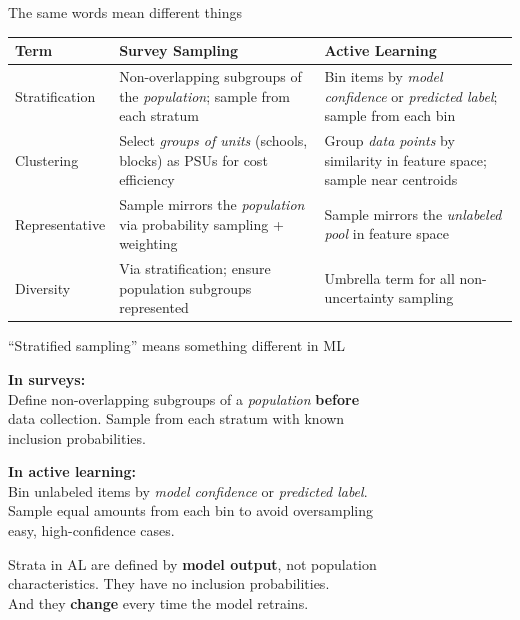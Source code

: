 \documentclass[aspectratio=169,11pt]{beamer}
\begin{document}
\begin{frame}{The same words mean different things}
\begin{center}
\footnotesize
\begin{tabularx}{\textwidth}{lXX}
\toprule
\textbf{Term} & \textbf{Survey Sampling} & \textbf{Active Learning} \\
\midrule
Stratification & Non-overlapping subgroups of the \textit{population}; sample from each stratum &
  Bin items by \textit{model confidence} or \textit{predicted label}; sample from each bin \\[0.8em]
Clustering & Select \textit{groups of units} (schools, blocks) as PSUs for cost efficiency &
  Group \textit{data points} by similarity in feature space; sample near centroids \\[0.8em]
Representative & Sample mirrors the \textit{population} via probability sampling + weighting &
  Sample mirrors the \textit{unlabeled pool} in feature space \\[0.8em]
Diversity & Via stratification; ensure population subgroups represented &
  Umbrella term for all non-uncertainty sampling \\
\bottomrule
\end{tabularx}
\end{center}
\end{frame}

\begin{frame}{``Stratified sampling'' means something different in ML}

\textbf{In surveys:}\\
Define non-overlapping subgroups of a \textit{population} \textbf{before}\\
data collection. Sample from each stratum with known\\
inclusion probabilities.

\vspace{1em}

\textbf{In active learning:}\\
Bin unlabeled items by \textit{model confidence} or \textit{predicted label}.\\
Sample equal amounts from each bin to avoid oversampling\\
easy, high-confidence cases.

\vspace{1em}

Strata in AL are defined by \textbf{model output}, not population\\
characteristics. They have no inclusion probabilities.\\
And they \textbf{change} every time the model retrains.
\end{frame}
\end{document}
